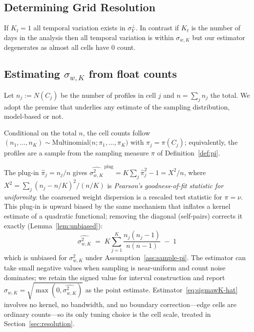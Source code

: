 \subsection{Determining Grid Resolution}
\label{sec:chooseK}

If $K_t = 1$ all temporal variation exists in $\sigma_Y^{\perp}$.
In contrast if $K_t$ is the number of days in the analysis then all temporal variation is within $\sigma_{w,K}$ but our estimator degenerates as almost all cells have 0 count.


\subsection{Estimating $\sigma_{w,K}$ from float counts}
\label{sec:sigmawK}

Let $n_j:=N(C_j)$ be the number of profiles in cell $j$ and
$n=\sum_j n_j$ the total. We adopt the premise that underlies any
estimate of the sampling distribution, model-based or not.

\begin{assumption}
\label{ass:sample-pi}
Conditional on the total $n$, the cell counts follow
$(n_1,\dots,n_K)\sim\mathrm{Multinomial}\big(n;\pi_1,\dots,\pi_K\big)$
with $\pi_j=\pi(C_j)$; equivalently, the profiles are a sample from the
sampling measure $\pi$ of Definition~\ref{def:pi}.
\end{assumption}

The plug-in $\hat\pi_j=n_j/n$ gives
$\widehat{\sigma_{w,K}^2}^{\,\mathrm{plug}}=K\sum_j\hat\pi_j^2-1=X^2/n$,
where $X^2=\sum_j(n_j-n/K)^2/(n/K)$ is \emph{Pearson's
goodness-of-fit statistic for uniformity}: the coarsened weight
dispersion is a rescaled test statistic for $\pi=\nu$. This plug-in is
upward biased by the same mechanism that inflates a kernel estimate of
a quadratic functional; removing the diagonal (self-pairs) corrects it
exactly (Lemma~\ref{lem:unbiased}):
\begin{equation}
  \boxed{\;
  \widehat{\sigma_{w,K}^2}
  \;=\;K\sum_{j=1}^{K}\frac{n_j(n_j-1)}{n(n-1)}\;-\;1\;}
  \label{eq:sigmawK-hat}
\end{equation}
which is unbiased for $\sigma_{w,K}^2$ under
Assumption~\ref{ass:sample-pi}. The estimator can take small negative
values when sampling is near-uniform and count noise dominates; we
retain the signed value for interval construction and report
$\hat\sigma_{w,K}=\sqrt{\max(0,\widehat{\sigma_{w,K}^2})}$ as the point
estimate. Estimator~\eqref{eq:sigmawK-hat} involves no kernel, no
bandwidth, and no boundary correction---edge cells are ordinary
counts---so its only tuning choice is the cell scale, treated in
Section~\ref{sec:resolution}.

